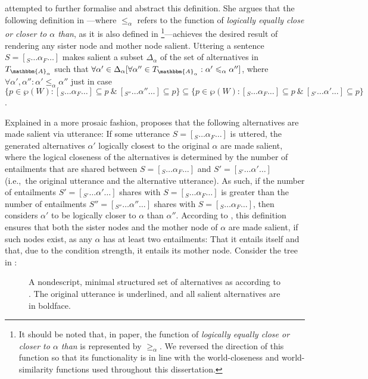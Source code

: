 \textcite{Ippolito2020} attempted to further formalise and abstract this definition. She argues that the following definition in ---where $\leqslant_\alpha$ refers to the function of \textit{logically equally close or closer to $\alpha$ than}, as it is also defined in \footnote{It should be noted that, in  paper, the function of \textit{logically equally close or closer to $\alpha$ than} is represented by $\geqslant_\alpha$. We reversed the direction of this function so that its functionality is in line with the world-closeness and world-similarity functions used throughout this dissertation.}---achieves the desired result of rendering any sister node and mother node salient. 
\ex
{}
Uttering a sentence $S=[_S\ldots\alpha_F\ldots]$ makes salient a subset $\Delta_\alpha$ of the set of alternatives in $T_{\mathbbm{A}_\alpha}$ such that $\forall\alpha'\in\Delta_\alpha[\forall\alpha''\in T_{\mathbbm{A}_\alpha}: \alpha'\leqslant_\alpha \alpha'']$, where $\forall\alpha',\alpha'':\alpha'\leqslant_\alpha \alpha''$ just in case $\{p\in\wp(W):[_S\ldots\alpha_F\ldots]\subseteq p~\&~[_{S''}\ldots\alpha''\ldots]\subseteq p\}\subseteq\{p\in\wp(W):[_S\ldots\alpha_F\ldots]\subseteq p~\&~[_{S'}\ldots\alpha'\ldots]\subseteq p\}$.\\\emptyfill\parencite[p. 642]{Ippolito2020}
\xe

Explained in a more prosaic fashion, \textcite{Ippolito2020} proposes that the following alternatives are made salient via utterance: If some utterance $S=[_S\ldots\alpha_F\ldots]$ is uttered, the generated alternatives $\alpha'$ logically closest to the original $\alpha$ are made salient, where the logical closeness of the alternatives is determined by the number of entailments that are shared between $S=[_S\ldots\alpha_F\ldots]$ and $S'=[_{S'}\ldots\alpha'\ldots]$ (i.e.,~the original utterance and the alternative utterance). As such, if the number of entailments $S'=[_{S'}\ldots\alpha'\ldots]$ shares with $S=[_{S}\ldots\alpha_F\ldots]$ is greater than the number of entailments $S''=[_{S''}\ldots\alpha''\ldots]$ shares with $S=[_{S}\ldots\alpha_F\ldots]$, then \textcite{Ippolito2020} considers $\alpha'$ to be logically closer to $\alpha$ than $\alpha''$. According to \textcite{Ippolito2020}, this definition ensures that both the sister nodes and the mother node of $\alpha$ are made salient, if such nodes exist, as any $\alpha$ has at least two entailments: That it entails itself and that, due to the condition strength, it entails its mother node. Consider the tree in :
\begin{figure}[!htb]
    \centering
    \hspace{-7cm}
    \caption{A nondescript, minimal structured set of alternatives as according to \textcite{Ippolito2020}. The original utterance is underlined, and all salient alternatives are in boldface.}
\end{figure}

